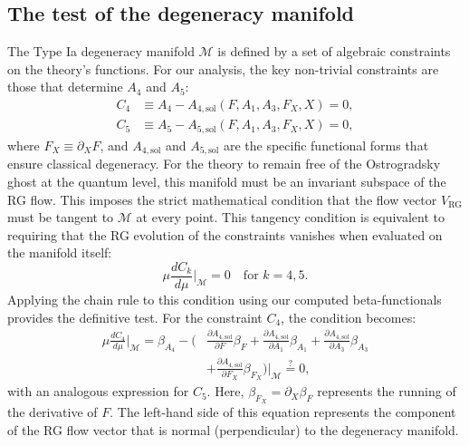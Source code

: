 \documentclass[twocolumn]{aastex631}
\begin{document}
\subsection{The test of the degeneracy manifold}

The Type Ia degeneracy manifold $\mathcal{M}$ is defined by a set of algebraic constraints on the theory's functions. For our analysis, the key non-trivial constraints are those that determine $A_4$ and $A_5$:
\begin{align}
    C_4 &\equiv A_4 - A_{4,\text{sol}}(F, A_1, A_3, F_X, X) = 0, \label{eq:C4_def} \\
    C_5 &\equiv A_5 - A_{5,\text{sol}}(F, A_1, A_3, F_X, X) = 0, \label{eq:C5_def}
\end{align}
where $F_X \equiv \partial_X F$, and $A_{4,\text{sol}}$ and $A_{5,\text{sol}}$ are the specific functional forms that ensure classical degeneracy. For the theory to remain free of the Ostrogradsky ghost at the quantum level, this manifold must be an invariant subspace of the RG flow. This imposes the strict mathematical condition that the flow vector $V_{\text{RG}}$ must be tangent to $\mathcal{M}$ at every point. This tangency condition is equivalent to requiring that the RG evolution of the constraints vanishes when evaluated on the manifold itself:
\begin{equation}
    \mu \frac{dC_k}{d\mu} \bigg|_{\mathcal{M}} = 0 \quad \text{for } k=4, 5. \label{eq:tangency_cond}
\end{equation}
Applying the chain rule to this condition using our computed beta-functionals provides the definitive test. For the constraint $C_4$, the condition becomes:
\begin{equation}
\begin{aligned}
    \mu \frac{dC_4}{d\mu} \bigg|_{\mathcal{M}} = \beta_{A_4} - \bigg( &\frac{\partial A_{4,\text{sol}}}{\partial F}\beta_F + \frac{\partial A_{4,\text{sol}}}{\partial A_1}\beta_{A_1} + \frac{\partial A_{4,\text{sol}}}{\partial A_3}\beta_{A_3} \\
    &+ \frac{\partial A_{4,\text{sol}}}{\partial F_X}\beta_{F_X} \bigg) \bigg|_{\mathcal{M}} \stackrel{?}{=} 0,
\end{aligned}
\label{eq:flow_C4}
\end{equation}
with an analogous expression for $C_5$. Here, $\beta_{F_X} = \partial_X \beta_F$ represents the running of the derivative of $F$. The left-hand side of this equation represents the component of the RG flow vector that is normal (perpendicular) to the degeneracy manifold.
\end{document}
